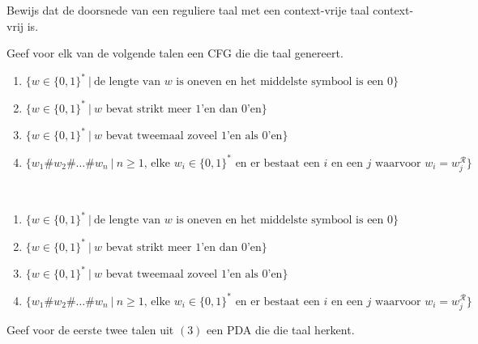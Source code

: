\documentclass[a4paper]{article}
\begin{document}
\begin{question}
Bewijs dat de doorsnede van een reguliere taal met een context-vrije taal context-vrij is.
\end{question}

\begin{question}
Geef voor elk van de volgende talen een CFG die die taal genereert.
\begin{enumerate}
 \item $\{ w \in \{0,1\}^* \ | \ \text{de lengte van $w$ is oneven en het middelste symbool is een $0$} \}$
 \item $\{ w \in \{0,1\}^* \ | \ \text{$w$ bevat strikt meer $1$'en dan $0$'en} \}$
 \item $\{ w \in \{0,1\}^* \ | \ \text{$w$ bevat tweemaal zoveel $1$'en als $0$'en} \}$
 \item $\{ w_1 \# w_2 \# \ldots \# w_n \ | \ \text{$n \geq 1$, elke $w_i \in \{0,1\}^*$ en er bestaat een $i$ en een $j$ waarvoor $w_i = w_j^\mathcal{R}$} \}$
\end{enumerate}

\begin{answer}~~
\begin{enumerate}
 \item $\{ w \in \{0,1\}^* \ | \ \text{de lengte van $w$ is oneven en het middelste symbool is een $0$} \}$
 \item $\{ w \in \{0,1\}^* \ | \ \text{$w$ bevat strikt meer $1$'en dan $0$'en} \}$
 \item $\{ w \in \{0,1\}^* \ | \ \text{$w$ bevat tweemaal zoveel $1$'en als $0$'en} \}$
 \item $\{ w_1 \# w_2 \# \ldots \# w_n \ | \ \text{$n \geq 1$, elke $w_i \in \{0,1\}^*$ en er bestaat een $i$ en een $j$ waarvoor $w_i = w_j^\mathcal{R}$} \}$
\end{enumerate}
\end{answer}
\end{question}

\begin{question}
Geef voor de eerste twee talen uit $(3)$ een PDA die die taal herkent.
\end{question}
\end{document}
